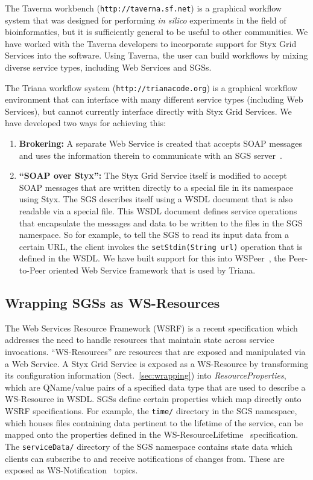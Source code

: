 \documentclass{article}
\begin{document}
The Taverna workbench ({\tt http://taverna.sf.net}) is a graphical workflow system that was designed for performing {\it in silico} experiments in the field of bioinformatics, but it is sufficiently general to be useful to other communities.  We have worked with the Taverna developers to incorporate support for Styx Grid Services into the software.  Using Taverna, the user can build workflows by mixing diverse service types, including Web Services and SGSs.

The Triana workflow system ({\tt http://trianacode.org}) is a graphical workflow environment that can interface with many different service types (including Web Services), but cannot currently interface directly with Styx Grid Services.  We have developed two ways for achieving this:

\begin{enumerate}
	\item {\bf Brokering:} A separate Web Service is created that accepts SOAP messages and uses the information therein to communicate with an SGS server~\cite{blower:2005}.
	\item {\bf ``SOAP over Styx'':} The Styx Grid Service itself is modified to accept SOAP messages that are written directly to a special file in its namespace using Styx.  The SGS describes itself using a WSDL document that is also readable via a special file.  This WSDL document defines service operations that encapsulate the messages and data to be written to the files in the SGS namespace.  So for example, to tell the SGS to read its input data from a certain URL, the client invokes the {\tt setStdin(String url)} operation that is defined in the WSDL. We have built support for this into WSPeer~\cite{wspeer}, the Peer-to-Peer oriented Web Service framework that is used by Triana.
\end{enumerate}

\subsection{Wrapping SGSs as WS-Resources}\label{subsec:ws-resources}

The Web Services Resource Framework (WSRF) is a recent specification which addresses the need to handle resources that maintain state across service invocations. ``WS-Resources'' are resources that are exposed and manipulated via a Web Service. A Styx Grid Service is exposed as a WS-Resource by transforming its configuration information (Sect.~\ref{sec:wrapping}) into {\em ResourceProperties\/}, which are QName/value pairs of a specified data type that are used to describe a WS-Resource in WSDL. SGSs define certain properties which map directly onto WSRF specifications. For example, the {\tt time/} directory in the SGS namespace, which houses files containing data pertinent to the lifetime of the service, can be mapped onto the properties defined in the WS-ResourceLifetime~\cite{wsrf-lifetime} specification.  The {\tt serviceData/} directory of the SGS namespace contains state data which clients can subscribe to and receive notifications of changes from. These are exposed as WS-Notification~\cite{wsrf-notification} topics.
\end{document}
